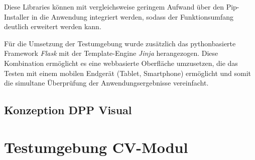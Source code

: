 \documentclass[
    type=Projektarbeit,
    status=draft, %
    language=german, %
    bibengine=bibtex,
]{unibwm-inf-thesis}
\begin{document}
    Diese Libraries können mit vergleichsweise geringem Aufwand über den Pip-Installer in die Anwendung integriert
    werden, sodass der Funktionsumfang deutlich erweitert werden kann.

    Für die Umsetzung der Testumgebung wurde zusätzlich das pythonbasierte Framework \textit{Flask} mit der
    Template-Engine \textit{Jinja} herangezogen.
    Diese Kombination ermöglicht es eine webbasierte Oberfläche umzusetzen, die das Testen mit einem mobilen Endgerät
    (Tablet, Smartphone) ermöglicht und somit die simultane Überprüfung der Anwendungsergebnisse vereinfacht.


    \section{Konzeption DPP Visual}


    \chapter{Testumgebung CV-Modul}



    

    
\end{document}
